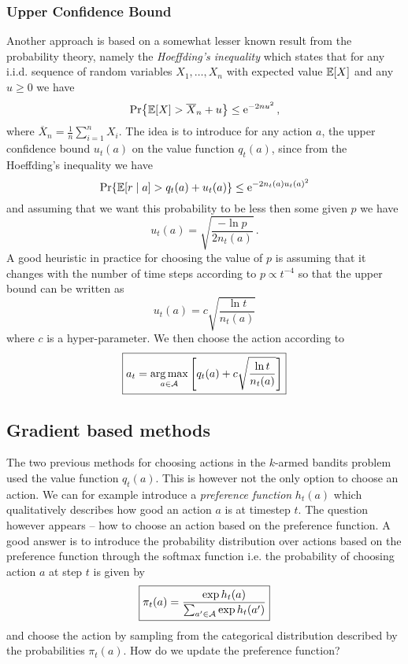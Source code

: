 \documentclass{myclass}
\begin{document}
\subsubsection{Upper Confidence Bound}

Another approach is based on a somewhat lesser known result from the probability theory, namely the
\emph{Hoeffding's inequality} which states that for any i.i.d. sequence of random variables
$X_1,\ldots,X_n$ with expected value $\mathbb{E}[X]$ and any $u \geq 0$ we have
\[
    \Pr{\mathbb{E}[X] > \overline{X}_n + u} \leq \mathrm{e}^{-2nu^2}\,,
\]
where $\displaystyle\overline{X}_n = \frac{1}{n} \sum_{i=1}^n X_i$. The idea is to introduce for any
action $a$, the upper confidence bound $u_t(a)$ on the value function $q_t(a)$, since from the
Hoeffding's inequality we have
\[
    \Pr{\mathbb{E}[r \mid a] > q_t(a) + u_t(a)} \leq \mathrm{e}^{-2 n_t(a) u_t(a)^2}
\]
and assuming that we want this probability to be less then some given $p$ we have
\[
    u_t(a) = \sqrt{\frac{-\ln p}{2 n_t(a)}}\,.
\]
A good heuristic in practice for choosing the value of $p$ is assuming that it changes with the
number of time steps according to $p \propto t^{-4}$ so that the upper bound can be written as
\[
\boxed
{
    u_t(a) = c \sqrt{\frac{\ln t}{n_t(a)}}
}
\]
where $c$ is a hyper-parameter. We then choose the action according to
\[
\boxed
{
    a_t = \operatorname*{arg\,max}_{a \in \mathcal{A}} \left[ q_t(a) + c \sqrt{\frac{\ln t}{n_t(a)}} \right]
}
\]


\subsection{Gradient based methods}

The two previous methods for choosing actions in the $k$-armed bandits problem used the value
function $q_t(a)$. This is however not the only option to choose an action. We can for example
introduce a \emph{preference function} $h_t(a)$ which qualitatively describes how good an action $a$
is at timestep $t$. The question however appears -- how to choose an action based on the preference
function. A good answer is to introduce the probability distribution over actions based on the
preference function through the softmax function i.e. the probability of choosing action $a$ at step
$t$ is given by
\[
\boxed
{
    \pi_t(a) = \frac{\exp h_t(a) }{\sum_{a' \in \mathcal{A}} \exp h_t(a')}
}
\]
and choose the action by sampling from the categorical distribution described by the probabilities
$\pi_t(a)$. How do we update the preference function? 
\end{document}
